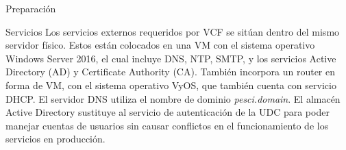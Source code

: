 \begin{subsection}{Preparación}
  \begin{subsubsection}{Servicios}
    Los servicios externos requeridos por VCF se sitúan dentro del mismo servidor físico. Estos están colocados en una VM con el sistema operativo Windows Server 2016, el cual incluye DNS, NTP, SMTP, y los servicios Active Directory (AD) y Certificate Authority (CA). También incorpora un router en forma de VM, con el sistema operativo VyOS, que también cuenta con servicio DHCP. El servidor DNS utiliza el nombre de dominio \textit{pesci.domain}. El almacén Active Directory sustituye al servicio de autenticación de la UDC para poder manejar cuentas de usuarios sin causar conflictos en el funcionamiento de los servicios en producción.
  \end{subsubsection}


\end{subsection}
